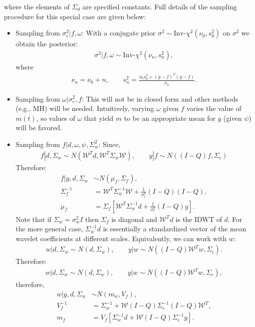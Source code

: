 \documentclass[a4paper,11pt]{article}
\begin{document}
where the elements of $\Sigma_{d}$ are specified constants. Full details of the sampling procedure for this special case are given below:
\begin{itemize}
\item Sampling from $\sigma^{2}_{\epsilon}|f,\omega$: With a conjugate prior $\sigma^{2}\sim\textrm{Inv-}\chi^{2}(\nu_{0},s_{0}^{2})$ on $\sigma^{2}$ we obtain the posterior:
\begin{align*}
 \sigma^{2} | f,\omega \sim \textrm{Inv-}\chi^{2}(\nu_{n},s_{n}^{2}) ,
\end{align*} 
where 
\begin{align*}
 \nu_{n} = \nu_{0} + n , \qquad s_{n}^{2} = \frac{\nu_{0}s_{0}^{2}+(y-f)^{T}(y-f)}{\nu_{n}} .
\end{align*}
\item Sampling from $\omega|\sigma^{2}_{\epsilon},f$: This will not be in closed form and other methods (e.g., MH) will be needed. Intuitively, varying $\omega$ given $f$ varies the value of $m(t)$, so values of $\omega$ that yield $m$ to be an appropriate mean for $y$ (given $\psi$) will be favored.
\item Sampling from $f|d,\omega,\psi,\Sigma^{2}_{w}$: Since,
\begin{align*}
f|d,\Sigma_{w} \sim N\left(\mathcal{W}^{T}d,\mathcal{W}^{T}\Sigma_{w}\mathcal{W}\right) , \qquad 
y|f \sim N\left((I-Q)f,\Sigma_{\epsilon}\right) 
\end{align*}
Therefore:
\begin{align*}
 f | y,d,\Sigma_{w} &\sim N\left(\mu_{f},\Sigma_{f}\right) , \\
 \Sigma_{f}^{-1} &= \mathcal{W}^{T}\Sigma_{w}^{-1}\mathcal{W} + \frac{1}{\sigma^{2}_{\epsilon}}(I-Q)(I-Q) ,\\
 \mu_{f} &= \Sigma_{f}\left[ \mathcal{W}^{T}\Sigma_{w}^{-1}d + \frac{1}{\sigma^{2}_{\epsilon}}(I-Q)y\right] .
\end{align*}
Note that if $\Sigma_{w}=\sigma^{2}_{w}I$ then $\Sigma_{f}$ is diagonal and $\mathcal{W}^{T}d$ is the IDWT of $d$. For the more general case, $\Sigma_{w}^{-1}d$ is essentially a standardized vector of the mean wavelet coefficients at different scales. Equivalently, we can work with $w$: 
\begin{align*}
w|d,\Sigma_{w} \sim N\left(d,\Sigma_{w}\right) , \qquad 
y|w \sim N\left((I-Q)\mathcal{W}^{T}w,\Sigma_{\epsilon}\right) .
\end{align*}
Therefore:
\begin{align*}
w|d,\Sigma_{w} \sim N\left(d,\Sigma_{w}\right) , \qquad 
y|w \sim N\left((I-Q)\mathcal{W}^{T}w,\Sigma_{\epsilon}\right) ,
\end{align*}
therefore,
\begin{align*}
 w| y,d,\Sigma_{w} &\sim N\left(m_{w},V_{f}\right) , \\
 V_{f}^{-1} &= \Sigma_{w}^{-1} + \mathcal{W}(I-Q)\Sigma_{\epsilon}^{-1}(I-Q)\mathcal{W}^{T} ,\\
 m_{f} &= V_{f}\left[ \Sigma_{w}^{-1}d + \mathcal{W}(I-Q)\Sigma_{\epsilon}^{-1}y\right] .
\end{align*}


\end{itemize}
\end{document}
